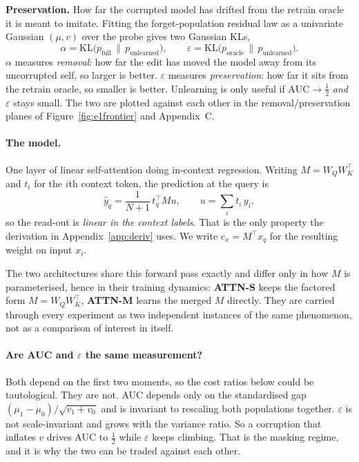 \documentclass[11pt,a4paper]{article}
\begin{document}
\textbf{Preservation.} How far the corrupted model has drifted from the
retrain oracle it is meant to imitate. Fitting the forget-population residual
law as a univariate Gaussian $(\mu,v)$ over the probe gives two Gaussian KLs,
\begin{equation}
\alpha = \mathrm{KL}\big(p_{\mathrm{full}} \,\|\, p_{\mathrm{unlearned}}\big),
\qquad
\varepsilon = \mathrm{KL}\big(p_{\mathrm{oracle}} \,\|\, p_{\mathrm{unlearned}}\big).
\end{equation}
$\alpha$ measures \emph{removal}: how far the edit has moved the model away
from its uncorrupted self, so larger is better. $\varepsilon$ measures
\emph{preservation}: how far it sits from the retrain oracle, so smaller is
better. Unlearning is only useful if $\mathrm{AUC}\to\tfrac12$ \emph{and}
$\varepsilon$ stays small. The two are plotted against each other in the
removal/preservation planes of Figure~\ref{fig:e1frontier} and Appendix~C.

\paragraph{The model.} One layer of linear self-attention doing in-context
regression. Writing $M=W_QW_K^{\!\top}$ and $t_i$ for the $i$th context token,
the prediction at the query is
\begin{equation}
\hat y_q = \frac{1}{N+1}\, t_q^{\!\top} M u ,
\qquad u = \sum_i t_i\,y_i ,
\label{eq:readout}
\end{equation}
so the read-out is \emph{linear in the context labels}. That is the only
property the derivation in Appendix~\ref{app:deriv} uses. We write
$c_x = M^{\!\top}x_q$ for the resulting weight on input $x_i$.

The two architectures share this forward pass exactly and differ only in how
$M$ is parameterised, hence in their training dynamics: \textbf{ATTN-S} keeps
the factored form $M=W_QW_K^{\!\top}$, \textbf{ATTN-M} learns the merged $M$
directly. They are carried through every experiment as two independent
instances of the same phenomenon, not as a comparison of interest in itself.

\paragraph{Are AUC and $\varepsilon$ the same measurement?} Both depend on the
first two moments, so the cost ratios below could be tautological. They are
not. AUC depends only on the standardised gap
$(\mu_1-\mu_0)/\sqrt{v_1+v_0}$ and is invariant to rescaling both populations
together. $\varepsilon$ is not scale-invariant and grows with the variance
ratio. So a corruption that inflates $v$ drives AUC to $\tfrac12$ while
$\varepsilon$ keeps climbing. That is the masking regime, and it is why the two
can be traded against each other.
\end{document}
